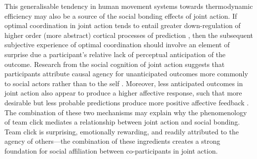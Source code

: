 This generalisable tendency in human movement systems towards thermodynamic efficiency may also be a source of the social bonding effects of joint action.  If optimal coordination in joint action tends to entail greater down-regulation of higher order (more abstract) cortical processes of prediction \citep{Dietrich2004b}, then the subsequent subjective experience of optimal coordination should involve an element of surprise due a participant's relative lack of perceptual anticipation of the outcome.  Research from the social cognition of joint action suggests that participants attribute causal agency for unanticipated outcomes more commonly to social actors rather than to the self \citep{Sato2008}.  Moreover, less anticipated outcomes in joint action also appear to produce a higher affective response, such that more desirable but less probable predictions produce more positive affective feedback \citep{Chetverikov2016}.  The combination of these two mechanisms may explain why the phenomenology of team click mediates a relationship between joint action and social bonding.  Team click is surprising, emotionally rewarding, and readily attributed to the agency of others---the combination of these ingredients creates a strong foundation for social affiliation between co-participants in joint action.
